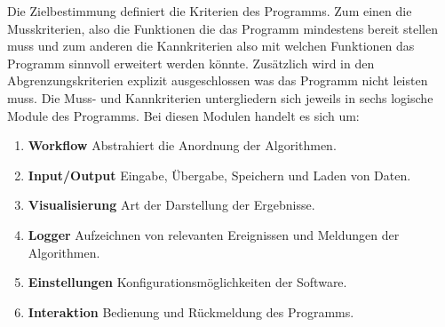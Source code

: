 Die Zielbestimmung definiert die Kriterien des Programms. Zum einen die Musskriterien, also die Funktionen die das Programm mindestens bereit stellen muss und zum anderen die Kannkriterien also mit welchen Funktionen das Programm sinnvoll erweitert werden könnte. Zusätzlich wird in den Abgrenzungskriterien explizit ausgeschlossen was das Programm nicht leisten muss. Die Muss- und Kannkriterien untergliedern sich jeweils in sechs logische Module des Programms. Bei diesen Modulen handelt es sich um:
\begin{enumerate}
	\item \textbf{Workflow} Abstrahiert die Anordnung der Algorithmen.
	\item \textbf{Input/Output} Eingabe, Übergabe, Speichern und Laden von Daten.
	\item \textbf{Visualisierung} Art der Darstellung der Ergebnisse.
	\item \textbf{Logger} Aufzeichnen von relevanten Ereignissen und Meldungen der Algorithmen.
	\item \textbf{Einstellungen} Konfigurationsmöglichkeiten der Software.
	\item \textbf{Interaktion} Bedienung und Rückmeldung des Programms.
\end{enumerate}